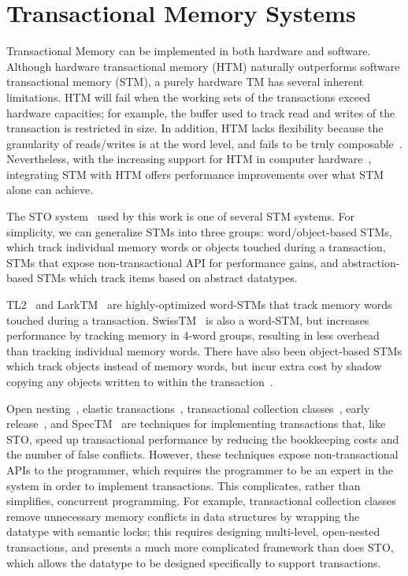 \section{Transactional Memory Systems}
Transactional Memory can be implemented in both hardware and software. Although hardware transactional memory (HTM) naturally outperforms software transactional memory (STM), a purely hardware TM has several inherent limitations. HTM will fail when the working sets of the transactions exceed hardware capacities; for example, the buffer used to track read and writes of the transaction is restricted in size. In addition, HTM lacks flexibility because the granularity of reads/writes is at the word level, and fails to be truly composable~\cite{htm}. Nevertheless, with the increasing support for HTM in computer hardware~\cite{intel_htm}, integrating STM with HTM offers performance improvements over what STM alone can achieve.

The STO system~\cite{sto} used by this work is one of several STM systems. For simplicity, we can generalize STMs into three groups: word/object-based STMs, which track individual memory words or objects touched during a transaction, STMs that expose non-transactional API for performance gains, and abstraction-based STMs which track items based on abstract datatypes.

TL2~\cite{tl2} and LarkTM~\cite{larktm} are highly-optimized word-STMs that track memory words touched during a transaction. SwissTM~\cite{swisstm} is also a word-STM, but increases performance by tracking memory in 4-word groups, resulting in less overhead than tracking individual memory words. There have also been object-based STMs which track objects instead of memory words, but incur extra cost by shadow copying any objects written to within the transaction~\cite{stm_objects}. 

Open nesting~\cite{opennesting}, elastic transactions~\cite{elastic}, transactional collection classes~\cite{tcc}, early release~\cite{earlyrelease}, and SpecTM~\cite{spectm} are techniques for implementing transactions that, like STO, speed up transactional performance by reducing the bookkeeping costs and the number of false conflicts. However, these techniques expose non-transactional APIs to the programmer, which requires the programmer to be an expert in the system in order to implement transactions. This complicates, rather than simplifies, concurrent programming. For example, transactional collection classes remove unnecessary memory conflicts in data structures by wrapping the datatype with semantic locks; this requires designing multi-level, open-nested transactions, and presents a much more complicated framework than does STO, which allows the datatype to be designed specifically to support transactions.

